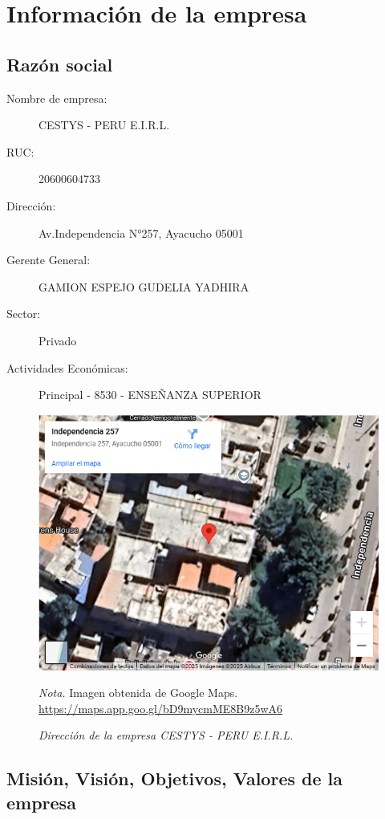 \section{Información de la empresa}

\subsection{Razón social}

\begin{description}
	\item[Nombre de empresa:] CESTYS - PERU E.I.R.L.
	\item[RUC:] 20600604733
	\item[Dirección:] Av.Independencia  N°257, Ayacucho 05001
	\item[Gerente General:] GAMION ESPEJO GUDELIA YADHIRA
	\item[Sector:] Privado
	\item[Actividades Económicas:] Principal - 8530 - ENSEÑANZA SUPERIOR
\end{description}

\begin{figure}[H]
	\centering
	\caption{\textit{Dirección de la empresa CESTYS - PERU E.I.R.L.}}
	\includegraphics[width=0.8\linewidth]{Figuras/11-08-08-2025-11.png} 
	\raggedright \textit{Nota.} Imagen obtenida de Google Maps. 
	\url{https://maps.app.goo.gl/bD9mycmME8B9z5wA6}
	\label{fig:ubicacion_empresa}
\end{figure}

\subsection{Misión, Visión, Objetivos, Valores de la empresa}


